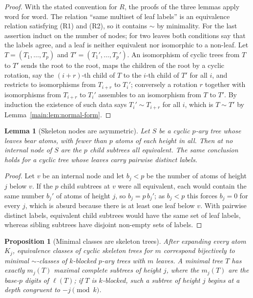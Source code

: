 \documentclass[11pt]{article}
\newtheorem{lemma}[theorem]{Lemma}
\newtheorem{proposition}[theorem]{Proposition}
\theoremstyle{definition}
\theoremstyle{remark}
\numberwithin{equation}{section}
\numberwithin{figure}{section}
\begin{document}
\begin{proof}
With the stated convention for $R$, the proofs of the three lemmas apply word for word.  The relation ``same multiset of leaf labels'' is an equivalence relation satisfying (R1) and (R2), so it contains $\sim$ by minimality.  For the last assertion induct on the number of nodes; for two leaves both conditions say that the labels agree, and a leaf is neither equivalent nor isomorphic to a non-leaf.  Let $T=(T_1,\ldots,T_p)$ and $T'=(T_1',\ldots,T_p')$.  An isomorphism of cyclic trees from $T$ to $T'$ sends the root to the root, maps the children of the root by a cyclic rotation, say the $(i+r)$-th child of $T$ to the $i$-th child of $T'$ for all $i$, and restricts to isomorphisms from $T_{i+r}$ to $T_i'$; conversely a rotation $r$ together with isomorphisms from $T_{i+r}$ to $T_i'$ assembles to an isomorphism from $T$ to $T'$.  By induction the existence of such data says $T_i'\sim T_{i+r}$ for all $i$, which is $T\sim T'$ by Lemma~\ref{main:lem:normal-form}.
\end{proof}
\begin{lemma}[Skeleton nodes are asymmetric]\label{main:lem:skeleton-asym}
Let $S$ be a cyclic $p$-ary tree whose leaves bear atoms, with fewer than $p$ atoms of each height in all.  Then at no internal node of $S$ are the $p$ child subtrees all equivalent.  The same conclusion holds for a cyclic tree whose leaves carry pairwise distinct labels.
\end{lemma}
\begin{proof}
Let $v$ be an internal node and let $b_j<p$ be the number of atoms of height $j$ below $v$.  If the $p$ child subtrees at $v$ were all equivalent, each would contain the same number $b_j'$ of atoms of height $j$, so $b_j=p\,b_j'$; as $b_j<p$ this forces $b_j=0$ for every $j$, which is absurd because there is at least one leaf below $v$.  With pairwise distinct labels, equivalent child subtrees would have the same set of leaf labels, whereas sibling subtrees have disjoint non-empty sets of labels.
\end{proof}
\begin{proposition}[Minimal classes are skeleton trees]\label{main:prop:skeleton}
After expanding every atom $K_j$, equivalence classes of cyclic skeleton trees for $m$ correspond bijectively to minimal $\sim$-classes of $k$-blocked $p$-ary trees with $m$ leaves.  A minimal tree $T$ has exactly $m_j(T)$ maximal complete subtrees of height $j$, where the $m_j(T)$ are the base-$p$ digits of $\ell(T)$; if $T$ is $k$-blocked, such a subtree of height $j$ begins at a depth congruent to $-j\pmod k$.
\end{proposition}
\end{document}
